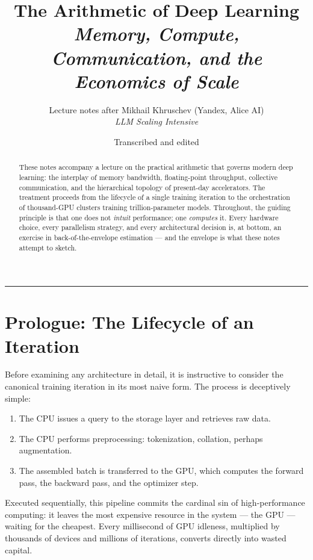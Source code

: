 \documentclass[11pt,a4paper]{article}
\title{\Huge\bfseries The Arithmetic of Deep Learning\\[0.3em]
\large\mdseries\itshape Memory, Compute, Communication, and the Economics of Scale}
\author{\normalsize Lecture notes after Mikhail Khruschev (Yandex, Alice AI)\\
\small\itshape LLM Scaling Intensive}
\date{\small Transcribed and edited}
\theoremstyle{definition}
\theoremstyle{remark}
\theoremstyle{plain}
\begin{document}
\sloppy
\maketitle


\begin{abstract}
\noindent These notes accompany a lecture on the practical arithmetic that governs modern deep learning: the interplay of memory bandwidth, floating-point throughput, collective communication, and the hierarchical topology of present-day accelerators. The treatment proceeds from the lifecycle of a single training iteration to the orchestration of thousand-GPU clusters training trillion-parameter models. Throughout, the guiding principle is that one does not \emph{intuit} performance; one \emph{computes} it. Every hardware choice, every parallelism strategy, and every architectural decision is, at bottom, an exercise in back-of-the-envelope estimation --- and the envelope is what these notes attempt to sketch.
\end{abstract}

\tableofcontents
\vspace{1em}
\hrule
\vspace{1em}

\section{Prologue: The Lifecycle of an Iteration}
\label{sec:prologue}

Before examining any architecture in detail, it is instructive to consider the canonical training iteration in its most naive form. The process is deceptively simple:
\begin{enumerate}[leftmargin=1.5em,itemsep=0.2em]
    \item The CPU issues a query to the storage layer and retrieves raw data.
    \item The CPU performs preprocessing: tokenization, collation, perhaps augmentation.
    \item The assembled batch is transferred to the GPU, which computes the forward pass, the backward pass, and the optimizer step.
\end{enumerate}

Executed sequentially, this pipeline commits the cardinal sin of high-performance computing: it leaves the most expensive resource in the system --- the GPU --- waiting for the cheapest. Every millisecond of GPU idleness, multiplied by thousands of devices and millions of iterations, converts directly into wasted capital.
\end{document}
